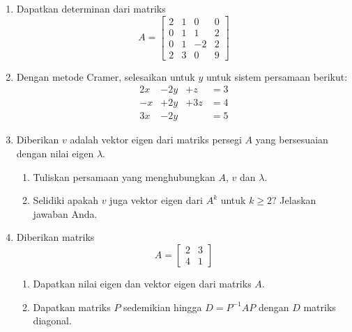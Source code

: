 \documentclass{article}
\theoremstyle{definition}
\begin{document}
\pagestyle{fancy}
\begin{enumerate}
  \item Dapatkan determinan dari matriks
  \[
  A = \begin{bmatrix}
  2 & 1 & 0 & 0 \\
  0 & 1 & 1 & 2 \\
  0 & 1 & -2 & 2 \\
  2 & 3 & 0 & 9
  \end{bmatrix}
  \]
  

  \item Dengan metode Cramer, selesaikan untuk $y$ untuk sistem persamaan berikut:
  \[
  \begin{aligned}
    2x& - 2y& + z &= 3 \\
    -x& + 2y& + 3z &= 4 \\
    3x& - 2y& &= 5
  \end{aligned}
  \]

  \item Diberikan $v$ adalah vektor eigen dari matriks persegi $A$ yang bersesuaian dengan nilai eigen $\lambda$.
  \begin{enumerate}
    \item Tuliskan persamaan yang menghubungkan $A$, $v$ dan $\lambda$.
    \item Selidiki apakah $v$ juga vektor eigen dari $A^k$ untuk $k \geq 2$? Jelaskan jawaban Anda.
  \end{enumerate}

  \item Diberikan matriks
  \[
  A = \begin{bmatrix}
  2 & 3 \\
  4 & 1
  \end{bmatrix}
  \]
  \begin{enumerate}
    \item Dapatkan nilai eigen dan vektor eigen dari matriks $A$.
    \item Dapatkan matriks $P$ sedemikian hingga $D = P^{-1}AP$ dengan $D$ matriks diagonal.
  \end{enumerate}
\end{enumerate}
\end{document}
